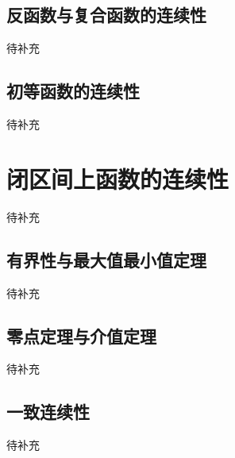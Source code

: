 \subsection{反函数与复合函数的连续性}
待补充
\subsection{初等函数的连续性}
待补充
\section{闭区间上函数的连续性}
待补充
\subsection{有界性与最大值最小值定理}
待补充
\subsection{零点定理与介值定理}
待补充
\subsection{一致连续性}
待补充
